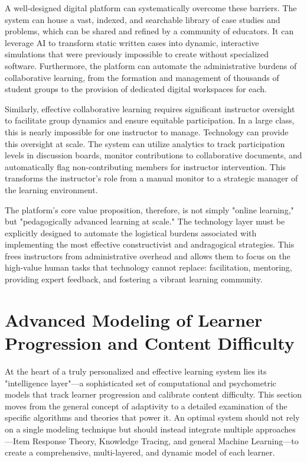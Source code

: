 \documentclass{article}
\begin{document}
A well-designed digital platform can systematically overcome these barriers. The system can house a vast, indexed, and searchable library of case studies and problems, which can be shared and refined by a community of educators.\cite{55, 57} It can leverage AI to transform static written cases into dynamic, interactive simulations that were previously impossible to create without specialized software.\cite{54} Furthermore, the platform can automate the administrative burdens of collaborative learning, from the formation and management of thousands of student groups to the provision of dedicated digital workspaces for each.\cite{65}

Similarly, effective collaborative learning requires significant instructor oversight to facilitate group dynamics and ensure equitable participation.\cite{59} In a large class, this is nearly impossible for one instructor to manage. Technology can provide this oversight at scale. The system can utilize analytics to track participation levels in discussion boards, monitor contributions to collaborative documents, and automatically flag non-contributing members for instructor intervention.\cite{63} This transforms the instructor's role from a manual monitor to a strategic manager of the learning environment.

The platform's core value proposition, therefore, is not simply "online learning," but "pedagogically advanced learning at scale." The technology layer must be explicitly designed to automate the logistical burdens associated with implementing the most effective constructivist and andragogical strategies. This frees instructors from administrative overhead and allows them to focus on the high-value human tasks that technology cannot replace: facilitation, mentoring, providing expert feedback, and fostering a vibrant learning community.

\section{Advanced Modeling of Learner Progression and Content Difficulty}

At the heart of a truly personalized and effective learning system lies its "intelligence layer"—a sophisticated set of computational and psychometric models that track learner progression and calibrate content difficulty. This section moves from the general concept of adaptivity to a detailed examination of the specific algorithms and theories that power it. An optimal system should not rely on a single modeling technique but should instead integrate multiple approaches—Item Response Theory, Knowledge Tracing, and general Machine Learning—to create a comprehensive, multi-layered, and dynamic model of each learner.
\end{document}

